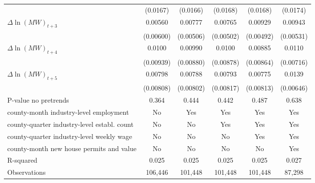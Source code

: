 {\begin{tabular}{l*{5}{c}}
          & (0.0167)         & (0.0166)         & (0.0168)         & (0.0168)         & (0.0174)         \\
[1em]
$\Delta \ln(MW)_{t+3}$&  0.00560         &  0.00777         &  0.00765         &  0.00929\sym{*}  &  0.00943\sym{*}  \\
          &(0.00600)         &(0.00506)         &(0.00502)         &(0.00492)         &(0.00531)         \\
[1em]
$\Delta \ln(MW)_{t+4}$&   0.0100         &  0.00990         &   0.0100         &  0.00885         &   0.0110         \\
          &(0.00939)         &(0.00880)         &(0.00878)         &(0.00864)         &(0.00716)         \\
[1em]
$\Delta \ln(MW)_{t+5}$&  0.00798         &  0.00788         &  0.00793         &  0.00775         &   0.0139\sym{**} \\
          &(0.00808)         &(0.00802)         &(0.00817)         &(0.00813)         &(0.00646)         \\
\hline
P-value no pretrends&    0.364         &    0.444         &    0.442         &    0.487         &    0.638         \\
county-month industry-level employment&       No         &      Yes         &      Yes         &      Yes         &      Yes         \\
county-quarter industry-level establ. count&       No         &       No         &      Yes         &      Yes         &      Yes         \\
county-quarter industry-level weekly wage&       No         &       No         &       No         &      Yes         &      Yes         \\
county-month new house permits and value&       No         &       No         &       No         &       No         &      Yes         \\
R-squared &    0.025         &    0.025         &    0.025         &    0.025         &    0.027         \\
Observations&  106,446         &  101,448         &  101,448         &  101,448         &   87,298         \\
\hline\hline
\end{tabular}
}
